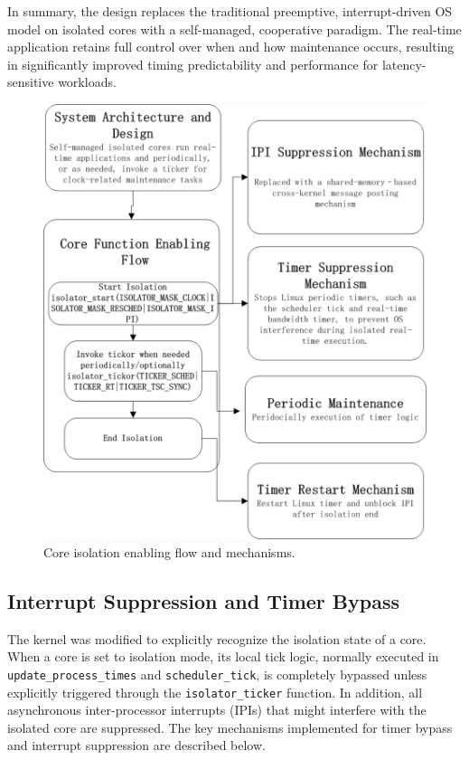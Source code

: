 \documentclass[letterpaper]{article}
\begin{document}
In summary, the design replaces the traditional preemptive, interrupt-driven OS model on isolated cores with a self-managed, cooperative paradigm. The real-time application retains full control over when and how maintenance occurs, resulting in significantly improved timing predictability and performance for latency-sensitive workloads.

\begin{figure}[htbp]
    \centering
    \includegraphics[width=0.9\linewidth]{Isolator.jpg}
    \caption{Core isolation enabling flow and mechanisms.}
    \label{fig:isolator_flow}
\end{figure}


\subsection{Interrupt Suppression and Timer Bypass}
\label{subsec:interrupt-timer}

The kernel was modified to explicitly recognize the isolation state of a core.
When a core is set to isolation mode, its local tick logic, normally executed in
\texttt{update\_process\_times} and \texttt{scheduler\_tick},
is completely bypassed unless explicitly triggered through the \texttt{isolator\_ticker} function.
In addition, all asynchronous inter-processor interrupts (IPIs) that might interfere with the
isolated core are suppressed. The key mechanisms implemented for timer bypass and interrupt suppression are described below.
\end{document}
